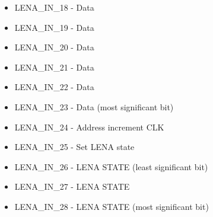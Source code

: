 \begin{itemize}
\item LENA\_IN\_18 - Data
\item LENA\_IN\_19 - Data
\item LENA\_IN\_20 - Data
\item LENA\_IN\_21 - Data
\item LENA\_IN\_22 - Data
\item LENA\_IN\_23 - Data (most significant bit)
\item LENA\_IN\_24 - Address increment CLK
\item LENA\_IN\_25 - Set LENA state
\item LENA\_IN\_26 - LENA STATE (least significant bit)
\item LENA\_IN\_27 - LENA STATE
\item LENA\_IN\_28 - LENA STATE (most significant bit)
\end{itemize}
